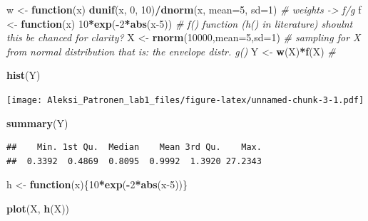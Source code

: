 \documentclass[
]{article}
\newenvironment{Shaded}{\begin{snugshade}}{\end{snugshade}}
\newcommand{\AttributeTok}[1]{\textcolor[rgb]{0.13,0.29,0.53}{#1}}
\newcommand{\CommentTok}[1]{\textcolor[rgb]{0.56,0.35,0.01}{\textit{#1}}}
\newcommand{\ControlFlowTok}[1]{\textcolor[rgb]{0.13,0.29,0.53}{\textbf{#1}}}
\newcommand{\DecValTok}[1]{\textcolor[rgb]{0.00,0.00,0.81}{#1}}
\newcommand{\FunctionTok}[1]{\textcolor[rgb]{0.13,0.29,0.53}{\textbf{#1}}}
\newcommand{\NormalTok}[1]{#1}
\newcommand{\OtherTok}[1]{\textcolor[rgb]{0.56,0.35,0.01}{#1}}
\newcommand{\SpecialCharTok}[1]{\textcolor[rgb]{0.81,0.36,0.00}{\textbf{#1}}}
\begin{document}
\begin{Shaded}
\begin{Highlighting}[]
\NormalTok{w }\OtherTok{\textless{}{-}} \ControlFlowTok{function}\NormalTok{(x) }\FunctionTok{dunif}\NormalTok{(x, }\DecValTok{0}\NormalTok{, }\DecValTok{10}\NormalTok{)}\SpecialCharTok{/}\FunctionTok{dnorm}\NormalTok{(x, }\AttributeTok{mean=}\DecValTok{5}\NormalTok{, }\AttributeTok{sd=}\DecValTok{1}\NormalTok{) }\CommentTok{\# weights {-}\textgreater{} f/g }
\NormalTok{f }\OtherTok{\textless{}{-}} \ControlFlowTok{function}\NormalTok{(x) }\DecValTok{10}\SpecialCharTok{*}\FunctionTok{exp}\NormalTok{(}\SpecialCharTok{{-}}\DecValTok{2}\SpecialCharTok{*}\FunctionTok{abs}\NormalTok{(x}\DecValTok{{-}5}\NormalTok{)) }\CommentTok{\# f() function (h() in literature) shouln\textquotesingle{}t this be chanced for clarity?}
\NormalTok{X }\OtherTok{\textless{}{-}} \FunctionTok{rnorm}\NormalTok{(}\DecValTok{10000}\NormalTok{,}\AttributeTok{mean=}\DecValTok{5}\NormalTok{,}\AttributeTok{sd=}\DecValTok{1}\NormalTok{) }\CommentTok{\# sampling for X from normal distribution that is: the envelope distr. g()}
\NormalTok{Y }\OtherTok{\textless{}{-}} \FunctionTok{w}\NormalTok{(X)}\SpecialCharTok{*}\FunctionTok{f}\NormalTok{(X) }\CommentTok{\# }


\FunctionTok{hist}\NormalTok{(Y)}
\end{Highlighting}
\end{Shaded}

\texttt{[image: Aleksi\_Patronen\_lab1\_files/figure-latex/unnamed-chunk-3-1.pdf]}

\begin{Shaded}
\begin{Highlighting}[]
\FunctionTok{summary}\NormalTok{(Y)}
\end{Highlighting}
\end{Shaded}

\begin{verbatim}
##    Min. 1st Qu.  Median    Mean 3rd Qu.    Max. 
##  0.3392  0.4869  0.8095  0.9992  1.3920 27.2343
\end{verbatim}

\begin{Shaded}
\begin{Highlighting}[]
\NormalTok{h }\OtherTok{\textless{}{-}} \ControlFlowTok{function}\NormalTok{(x)\{}\DecValTok{10}\SpecialCharTok{*}\FunctionTok{exp}\NormalTok{(}\SpecialCharTok{{-}}\DecValTok{2}\SpecialCharTok{*}\FunctionTok{abs}\NormalTok{(x}\DecValTok{{-}5}\NormalTok{))\}}

\FunctionTok{plot}\NormalTok{(X, }\FunctionTok{h}\NormalTok{(X))}
\end{Highlighting}
\end{Shaded}
\end{document}
